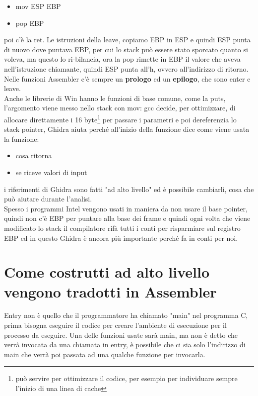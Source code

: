 \documentclass[12pt, oneside]{extbook}
\begin{document}
\begin{itemize}
\item \textsf{mov ESP EBP}
\item \textsf{pop EBP}
\end{itemize}
poi c'è la \textsf{ret}. Le istruzioni della leave, copiamo EBP in ESP e quindi ESP punta di nuovo dove puntava EBP, per cui lo stack può essere stato sporcato quanto si voleva, ma questo lo ri-bilancia, ora la pop rimette in EBP il valore che aveva nell'istruzione chiamante, quindi ESP punta all'h, ovvero all'indirizzo di ritorno. Nelle funzioni Assembler c'è sempre un \textbf{prologo} ed un \textbf{epilogo}, che sono enter e leave.\\ Anche le librerie di Win hanno le funzioni di base comune, come la puts, l'argomento viene messo nello stack con \textsf{mov}: gcc decide, per ottimizzare, di allocare direttamente i 16 byte\footnote{può servire per ottimizzare il codice, per esempio per individuare sempre l'inizio di una linea di cache} per passare i parametri e poi dereferenzia lo stack pointer, Ghidra aiuta perché all'inizio della funzione dice come viene usata la funzione:
\begin{itemize}
\item cosa ritorna
\item se riceve valori di input
\end{itemize}
i riferimenti di Ghidra sono fatti "ad alto livello" ed è possibile cambiarli, cosa che può aiutare durante l'analisi.\\ Spesso i programmi Intel vengono usati in maniera da non usare il base pointer, quindi non c'è EBP per puntare alla base dei frame e quindi ogni volta che viene modificato lo stack il compilatore rifà tutti i conti per risparmiare sul registro EBP ed in questo Ghidra è ancora più importante perché fa in conti per noi.
\section{Come  costrutti ad alto livello vengono tradotti in Assembler}
Entry non è quello che il programmatore ha chiamato "main" nel programma C, prima bisogna eseguire il codice per creare l'ambiente di esecuzione per il processo da eseguire. Una delle funzioni usate sarà main, ma non è detto che verrà invocata da una chiamata in entry, è possibile che ci sia solo l'indirizzo di main che verrà poi passata ad una qualche funzione per invocarla. 
\end{document}
